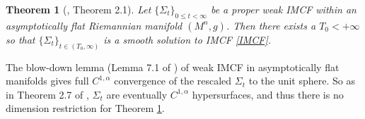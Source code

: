 \documentclass[12pt]{amsart}
\newtheorem{theorem}{Theorem}[section]
\theoremstyle{definition}
\numberwithin{equation}{section}
\begin{document}
\begin{theorem}[\cite{HW24a}, Theorem 2.1] \label{smoothing}
Let $\{ \Sigma_{t} \}_{0 \leq t < \infty}$ be a proper weak IMCF within an asymptotically flat Riemannian manifold $(M^{n},g)$. Then there exists a $T_{0} < +\infty$ so that $\{ \Sigma_{t} \}_{t \in (T_{0},\infty)}$ is a smooth solution to IMCF \eqref{IMCF}.
\end{theorem}
The blow-down lemma (Lemma 7.1 of \cite{HI99}) of weak IMCF in asymptotically flat manifolds gives full $C^{1,\alpha}$ convergence of the rescaled $\Sigma_{t}$ to the unit sphere. So as in Theorem 2.7 of \cite{HI08}, $\Sigma_{t}$ are eventually $C^{1,\alpha}$ hypersurfaces, and thus there is no dimension restriction for Theorem \ref{smoothing}.


\end{document}
